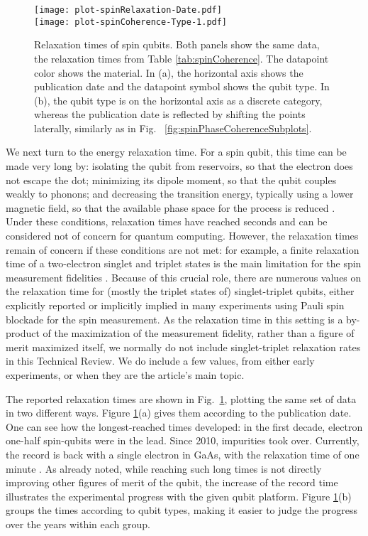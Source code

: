 \documentclass[aps, prx, showpacs, twocolumn, superscriptaddress, notitlepage, longbibliography, floatfix, nofootinbib]{revtex4-2}
\newcommand{\recheck}[1]{{#1}}
\begin{document}
\begin{figure}
  \texttt{[image: plot-spinRelaxation-Date.pdf]} \hfill\\
  \texttt{[image: plot-spinCoherence-Type-1.pdf]} \hfill
  \caption{
  \label{fig:spinRelaxation}
  Relaxation times of spin qubits. Both panels show the same data, the relaxation times from Table \ref{tab:spinCoherence}. The datapoint color shows the material. In (a), the horizontal axis shows the publication date and the datapoint symbol shows the qubit type. In (b), the qubit type is on the horizontal axis as a discrete category, whereas the publication date is reflected by shifting the points laterally, similarly as in Fig. ~\ref{fig:spinPhaseCoherenceSubplots}.}
\end{figure}


We next turn to the energy relaxation time. For a spin qubit, this time can be made very long by: isolating the qubit from reservoirs, so that the electron does not escape the dot; minimizing its dipole moment, so that the qubit couples weakly to phonons; and decreasing the transition energy, typically using a lower magnetic field, so that the available phase space for the process is reduced \cite{shrivastava_theory_1983,khaetskii_spin-flip_2001}. Under these conditions, relaxation times have reached seconds and can be considered not of concern for quantum computing. However, the relaxation times remain of concern if these conditions are not met: for example, a finite relaxation time of a two-electron singlet and triplet states is the main limitation for the spin measurement fidelities \cite{barthel_rapid_2009,nakajima_robust_2017,broome_high-fidelity_2017}. 
Because of this crucial role, there are numerous values on the relaxation time for (mostly the triplet states of) singlet-triplet qubits, either explicitly reported or implicitly implied in many experiments using Pauli spin blockade for the spin measurement. As the relaxation time in this setting is a by-product of the maximization of the measurement fidelity, rather than a figure of merit maximized itself, we normally do not include singlet-triplet relaxation rates in this Technical Review. We do include a few values, from either early experiments, or when they are the article's main topic.

The reported relaxation times are shown in Fig.~\ref{fig:spinRelaxation}, plotting the same set of data in two different ways. Figure \ref{fig:spinRelaxation}(a) gives them according to the publication date. One can see how the longest-reached times developed: in the first decade, electron one-half spin-qubits were in the lead. Since 2010, impurities took over. \recheck{Currently, the record is back with a single electron in GaAs, with the relaxation time of one minute \cite{camenzind_hyperfine-phonon_2018}.} As already noted, while reaching such long times is not directly improving other figures of merit of the qubit, the increase of the record time illustrates the experimental progress with the given qubit platform. Figure \ref{fig:spinRelaxation}(b) groups the times according to qubit types, making it easier to judge the progress over the years within each group. 
\end{document}
